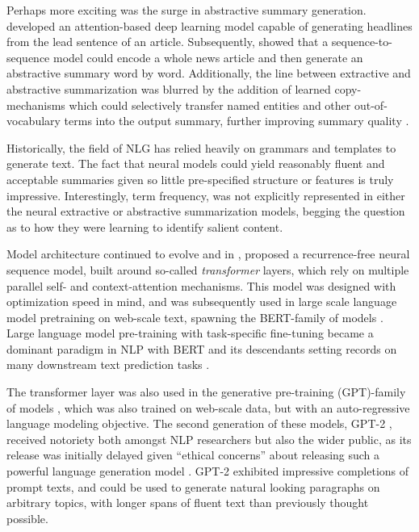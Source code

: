 Perhaps more exciting was the surge in abstractive summary generation.
\cite{rush2015} developed an attention-based deep learning  model capable of
generating headlines from the lead sentence of an article. Subsequently,
\citet{nallapati2016} showed that a sequence-to-sequence model could encode a
whole news article and then generate an abstractive summary word by word.
Additionally, the line between extractive and abstractive summarization was
blurred by the addition of learned copy-mechanisms which could selectively
transfer named entities and other out-of-vocabulary terms into the output
summary, further improving summary quality \citep{see2017}.  

Historically, the field of NLG has relied heavily on grammars and templates to
generate text. The fact that neural models could yield reasonably fluent and
acceptable summaries given so little pre-specified structure or features is
truly impressive.  Interestingly, term frequency, was not explicitly
represented in either the neural extractive or abstractive summarization
models, begging the question as to how they were learning to identify salient
content.

Model architecture continued to evolve and in \citeyear{vaswani2017},
\citeauthor{vaswani2017} proposed a recurrence-free neural sequence model,
built around so-called \textit{transformer} layers, which rely on multiple
parallel self- and context-attention mechanisms.  This model was designed with
optimization speed in mind, and was subsequently used in large scale language
model pretraining on web-scale text, spawning the BERT-family of models
\citep{devlin2019}. Large language model pre-training with task-specific
fine-tuning became a dominant paradigm in NLP with BERT and its descendants
setting records on many downstream text prediction tasks \citep{ruder2019}.

The transformer layer was also used in the generative pre-training (GPT)-family
of models \citep{radford2018improving}, which was  also trained on web-scale
data, but with an auto-regressive language modeling objective.  The second
generation of these models, GPT-2 \citep{radford2019}, received notoriety both
amongst NLP researchers but also the wider public, as its release was initially
delayed given ``ethical concerns'' about releasing such a powerful language
generation model \citep{vincent2019,seabrook2019}.  GPT-2 exhibited impressive
completions of prompt texts, and could be used to generate natural looking
paragraphs on arbitrary topics, with longer spans of fluent text than
previously thought possible. 
  

